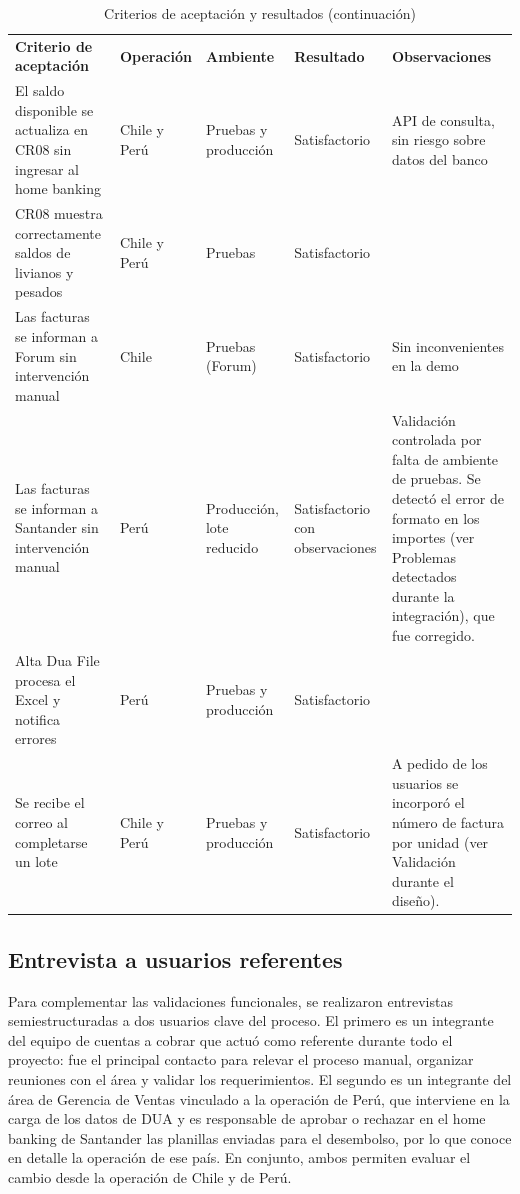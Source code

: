 \begin{longtable}[]{@{}
  >{\raggedright\arraybackslash}p{}
  >{\raggedright\arraybackslash}p{}
  >{\raggedright\arraybackslash}p{}
  >{\raggedright\arraybackslash}p{}
  >{\raggedright\arraybackslash}p{}@{}}
\caption{Criterios de aceptación y resultados}\label{tab:17}\\
\toprule\noalign{}
\endfirsthead
\caption[]{Criterios de aceptación y resultados (continuación)}\\
\toprule\noalign{}
\endhead
\bottomrule\noalign{}
\endlastfoot
\textbf{Criterio de aceptación} & \textbf{Operación} & \textbf{Ambiente} & \textbf{Resultado} & \textbf{Observaciones} \\
El saldo disponible se actualiza en CR08 sin ingresar al home banking & Chile y Perú & Pruebas y producción & Satisfactorio & API de consulta, sin riesgo sobre datos del banco \\
CR08 muestra correctamente saldos de livianos y pesados & Chile y Perú & Pruebas & Satisfactorio & \\
Las facturas se informan a Forum sin intervención manual & Chile & Pruebas (Forum) & Satisfactorio & Sin inconvenientes en la demo \\
Las facturas se informan a Santander sin intervención manual & Perú & Producción, lote reducido & Satisfactorio con observaciones & Validación controlada por falta de ambiente de pruebas. Se detectó el error de formato en los importes (ver Problemas detectados durante la integración), que fue corregido. \\
Alta Dua File procesa el Excel y notifica errores & Perú & Pruebas y producción & Satisfactorio & \\
Se recibe el correo al completarse un lote & Chile y Perú & Pruebas y producción & Satisfactorio & A pedido de los usuarios se incorporó el número de factura por unidad (ver Validación durante el diseño). \\
\end{longtable}

\subsection{Entrevista a usuarios referentes}

Para complementar las validaciones funcionales, se realizaron entrevistas semiestructuradas a dos usuarios clave del proceso. El primero es un integrante del equipo de cuentas a cobrar que actuó como referente durante todo el proyecto: fue el principal contacto para relevar el proceso manual, organizar reuniones con el área y validar los requerimientos. El segundo es un integrante del área de Gerencia de Ventas vinculado a la operación de Perú, que interviene en la carga de los datos de DUA y es responsable de aprobar o rechazar en el home banking de Santander las planillas enviadas para el desembolso, por lo que conoce en detalle la operación de ese país. En conjunto, ambos permiten evaluar el cambio desde la operación de Chile y de Perú.

